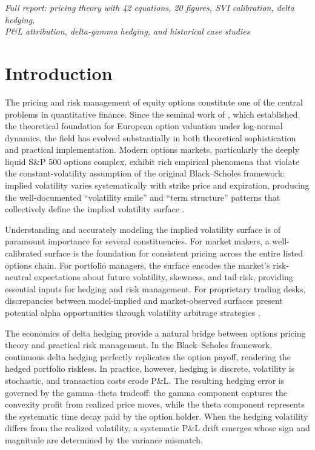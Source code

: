 \documentclass[11pt,a4paper]{article}
\begin{document}
\vspace{0.15cm}

\begin{center}
\small \textit{Full report: pricing theory with 42 equations, 20 figures, SVI calibration, delta hedging, \\
P\&L attribution, delta-gamma hedging, and historical case studies}
\end{center}

\newpage
\tableofcontents
\newpage


\section{Introduction}\label{sec:introduction}

The pricing and risk management of equity options constitute one of the central problems in quantitative finance. Since the seminal work of \citet{black1973pricing}, which established the theoretical foundation for European option valuation under log-normal dynamics, the field has evolved substantially in both theoretical sophistication and practical implementation. Modern options markets, particularly the deeply liquid S\&P 500 options complex, exhibit rich empirical phenomena that violate the constant-volatility assumption of the original Black--Scholes framework: implied volatility varies systematically with strike price and expiration, producing the well-documented ``volatility smile'' and ``term structure'' patterns that collectively define the implied volatility surface \citep{gatheral2006volatility}.

Understanding and accurately modeling the implied volatility surface is of paramount importance for several constituencies. For market makers, a well-calibrated surface is the foundation for consistent pricing across the entire listed options chain. For portfolio managers, the surface encodes the market's risk-neutral expectations about future volatility, skewness, and tail risk, providing essential inputs for hedging and risk management. For proprietary trading desks, discrepancies between model-implied and market-observed surfaces present potential alpha opportunities through volatility arbitrage strategies \citep{hull2021options}.

The economics of delta hedging provide a natural bridge between options pricing theory and practical risk management. In the Black--Scholes framework, continuous delta hedging perfectly replicates the option payoff, rendering the hedged portfolio riskless. In practice, however, hedging is discrete, volatility is stochastic, and transaction costs erode P\&L. The resulting hedging error is governed by the gamma--theta tradeoff: the gamma component captures the convexity profit from realized price moves, while the theta component represents the systematic time decay paid by the option holder. When the hedging volatility differs from the realized volatility, a systematic P\&L drift emerges whose sign and magnitude are determined by the variance mismatch.
\end{document}
